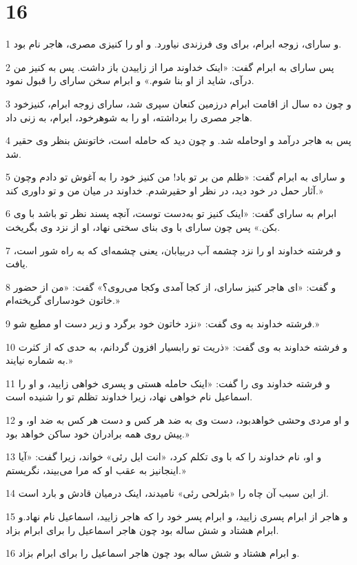 \chapter{16}

\par 1 و سارای، زوجه ابرام، برای وی فرزندی نیاورد. و او را کنیزی مصری، هاجر نام بود.
\par 2 پس سارای به ابرام گفت: «اینک خداوند مرا از زاییدن باز داشت. پس به کنیز من درآی، شاید از او بنا شوم.» و ابرام سخن سارای را قبول نمود.
\par 3 و چون ده سال از اقامت ابرام درزمین کنعان سپری شد، سارای زوجه ابرام، کنیزخود هاجر مصری را برداشته، او را به شوهرخود، ابرام، به زنی داد.
\par 4 پس به هاجر درآمد و اوحامله شد. و چون دید که حامله است، خاتونش بنظر وی حقیر شد.
\par 5 و سارای به ابرام گفت: «ظلم من بر تو باد! من کنیز خود را به آغوش تو دادم وچون آثار حمل در خود دید، در نظر او حقیرشدم. خداوند در میان من و تو داوری کند.»
\par 6 ابرام به سارای گفت: «اینک کنیز تو به‌دست توست، آنچه پسند نظر تو باشد با وی بکن.» پس چون سارای با وی بنای سختی نهاد، او از نزد وی بگریخت.
\par 7 و فرشته خداوند او را نزد چشمه آب دربیابان، یعنی چشمه‌ای که به راه شور است، یافت.
\par 8 و گفت: «ای هاجر کنیز سارای، از کجا آمدی وکجا می‌روی؟» گفت: «من از حضور خاتون خودسارای گریخته‌ام.»
\par 9 فرشته خداوند به وی گفت: «نزد خاتون خود برگرد و زیر دست او مطیع شو.»
\par 10 و فرشته خداوند به وی گفت: «ذریت تو رابسیار افزون گردانم، به حدی که از کثرت به شماره نیایند.»
\par 11 و فرشته خداوند وی را گفت: «اینک حامله هستی و پسری خواهی زایید، و او را اسماعیل نام خواهی نهاد، زیرا خداوند تظلم تو را شنیده است.
\par 12 و او مردی وحشی خواهدبود، دست وی به ضد هر کس و دست هر کس به ضد او، و پیش روی همه برادران خود ساکن خواهد بود.»
\par 13 و او، نام خداوند را که با وی تکلم کرد، «انت ایل رئی» خواند، زیرا گفت: «آیا اینجانیز به عقب او که مرا می‌بیند، نگریستم.»
\par 14 از این سبب آن چاه را «بئرلحی رئی» نامیدند، اینک درمیان قادش و بارد است.
\par 15 و هاجر از ابرام پسری زایید، و ابرام پسر خود را که هاجر زایید، اسماعیل نام نهاد.و ابرام هشتاد و شش ساله بود چون هاجر اسماعیل را برای ابرام بزاد.
\par 16 و ابرام هشتاد و شش ساله بود چون هاجر اسماعیل را برای ابرام بزاد.
 
